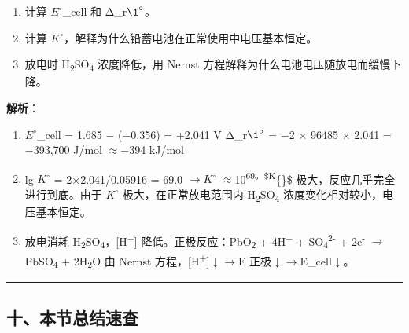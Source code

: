 \documentclass[a4paper,11pt]{ctexart}
\providecommand{\tightlist}{\setlength{\itemsep}{0pt}\setlength{\parskip}{0pt}}
\newcommand{\箭}{\ensuremath{\rightarrow}}
\newcommand{\左箭}{\ensuremath{\leftarrow}}
\newcommand{\上箭}{\ensuremath{\uparrow}}
\newcommand{\下箭}{\ensuremath{\downarrow}}
\newcommand{\衡}{\ensuremath{\rightleftharpoons}}
\newcommand{\双箭}{\ensuremath{\leftrightarrow}}
\newcommand{\约等于}{\ensuremath{\approx}}
\newcommand{\小于等于}{\ensuremath{\leq}}
\newcommand{\大于等于}{\ensuremath{\geq}}
\newcommand{\不等于}{\ensuremath{\neq}}
\newcommand{\西格马}{\ensuremath{\sigma}}
\newcommand{\派}{\ensuremath{\pi}}
\begin{document}
\begin{enumerate}
\def\labelenumi{(\alph{enumi})}
\tightlist
\item
  计算 \(E^{\circ}\)\_cell 和 Δ\_r\(\1^{\circ}\)。
\item
  计算 \(K^{\circ}\)，解释为什么铅蓄电池在正常使用中电压基本恒定。
\item
  放电时 H\textsubscript{2}SO\textsubscript{4} 浓度降低，用 Nernst 方程解释为什么电池电压随放电而缓慢下降。
\end{enumerate}

\textbf{解析}：

\begin{enumerate}
\def\labelenumi{(\alph{enumi})}
\item
  \(E^{\circ}\)\_cell = 1.685 − (−0.356) = +2.041 V
  Δ\_r\(\1^{\circ}\) = −2 × 96485 × 2.041 = −393,700 J/mol \约等于 −394 kJ/mol
\item
  lg \(K^{\circ}\) = 2×2.041/0.05916 = 69.0 \箭 \(K^{\circ}\) \约等于 10\textsuperscript{69。\$K}\{\circ\}\$ 极大，反应几乎完全进行到底。由于 \(K^{\circ}\) 极大，在正常放电范围内 H\textsubscript{2}SO\textsubscript{4} 浓度变化相对较小，电压基本恒定。
\item
  放电消耗 H\textsubscript{2}SO\textsubscript{4}，{[}H\textsuperscript{+}{]} 降低。正极反应：PbO\textsubscript{2} + 4H\textsuperscript{+} + SO\textsubscript{4}\textsuperscript{2-} + 2e\textsuperscript{-} \箭 PbSO\textsubscript{4} + 2H\textsubscript{2}O
  由 Nernst 方程，{[}H\textsuperscript{+}{]}\下箭 \箭 E 正极\下箭 \箭 E\_cell\下箭。
\end{enumerate}

\begin{center}\rule{0.5\linewidth}{0.5pt}\end{center}

\subsection{十、本节总结速查}\label{ux5341ux672cux8282ux603bux7ed3ux901fux67e5}
\end{document}
